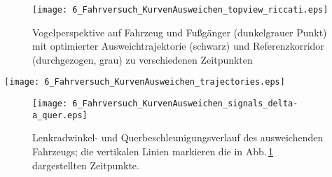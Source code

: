 \begin{figure}[!ht]
\centering

\renewcommand{\matlabtextA}{\footnotesize}
  	\texttt{[image: 6\_Fahrversuch\_KurvenAusweichen\_topview\_riccati.eps]}
\def\xlabel{$t$ in \unit{s}}
\caption[Vogelperspektive auf Fahrzeug und Fußgänger]{Vogelperspektive auf Fahrzeug und Fußgänger (dunkelgrauer Punkt) mit optimierter Ausweichtrajektorie (schwarz) und Referenzkorridor (durchgezogen, grau) zu verschiedenen Zeitpunkten }
		\label{fig:draufsicht}
\end{figure}
%
\begin{sidewaysfigure}
\centering

\renewcommand{\matlabtextA}{\footnotesize}
	\def\xlabel{$T_\text{tc}$ in \unit{s}}
	\def\ylabelU{$u$ in \unitfrac{m}{$s³$}}		
	\def\ylabelA{$x_3$ in \unitfrac{m}{$s²$}}
	\def\ylabelV{$x_2$ in \unitfrac{m}{s}}	
	\def\ylabelXlat{$x_1$ in  \unit{m}}
  	\texttt{[image: 6\_Fahrversuch\_KurvenAusweichen\_trajectories.eps]}
  \caption[Zustandsverläufe der Trajektorienplanung]{Zustandsverläufe der Trajektorienplanung mit optimierter Trajektorie (schwarz), tatsächliche, zukünftige Trajektorie (grau) und tatsächlich gefahrene Trajektorie (grau gestrichelt) zu den in Abb.\,\ref{fig:draufsicht} dargestellten Zeitpunkten }
  \label{fig:OptimalTrajektorienVerlaeufe}
\end{sidewaysfigure}




%
\begin{figure}[!ht]
\centering

	\def\xlabel{$t$ in \unit{s}}
	\def\ylabelB{$\delta_h$ in \unit{°}}		
	\def\ylabelA{$a_{q}$ in \unitfrac{m}{$s²$}}	
  	\texttt{[image: 6\_Fahrversuch\_KurvenAusweichen\_signals\_delta-a\_quer.eps]}
  \caption[Zustandsverläufe des ausweichenden Fahrzeugs]{Lenkradwinkel- und Querbeschleunigungsverlauf des ausweichenden Fahrzeugs; die vertikalen Linien markieren die in Abb.\,\ref{fig:draufsicht} dargestellten Zeitpunkte. } 
  \label{fig:LenkwinkelQerbeschleunigungsverlauf}
\end{figure}

